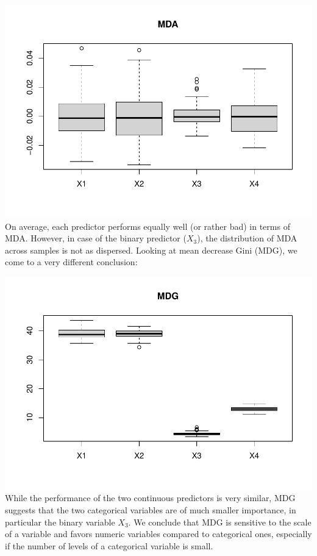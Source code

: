 \documentclass[
]{article}
\begin{document}
\includegraphics{A3_files/figure-latex/unnamed-chunk-24-1.pdf} On
average, each predictor performs equally well (or rather bad) in terms
of MDA. However, in case of the binary predictor (\(X_3\)), the
distribution of MDA across samples is not as dispersed. Looking at mean
decrease Gini (MDG), we come to a very different conclusion:

\includegraphics{A3_files/figure-latex/unnamed-chunk-25-1.pdf} While the
performance of the two continuous predictors is very similar, MDG
suggests that the two categorical variables are of much smaller
importance, in particular the binary variable \(X_3\). We conclude that
MDG is sensitive to the scale of a variable and favors numeric variables
compared to categorical ones, especially if the number of levels of a
categorical variable is small.
\end{document}

